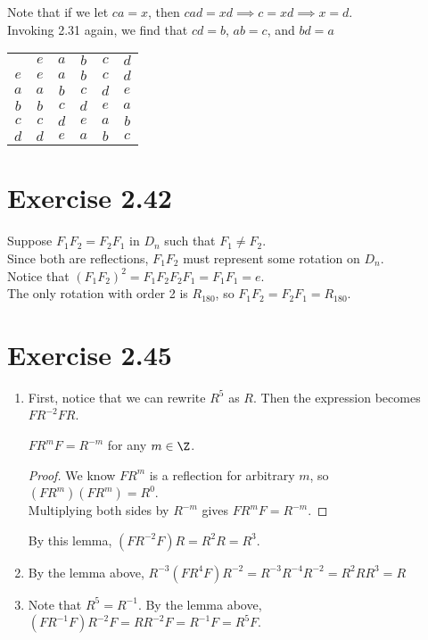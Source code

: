 \documentclass{article}
\begin{document}
Note that if we let \(ca=x\), then \(cad=xd\implies c=xd\implies x=d\). \\
Invoking 2.31 again, we find that \(cd=b\), \(ab=c\), and \(bd=a\)
\begin{center}
    \begin{tabular}{c | c c c c c}
        & $e$ & $a$ & $b$ & $c$ & $d$  \\
       \cline{1-6}
       $e$ & $e$ & $a$ & $b$ & $c$ & $d$ \\
       $a$ & $a$ & $b$ & $c$ & $d$ & $e$ \\
       $b$ & $b$ & $c$ & $d$ & $e$ & $a$ \\
       $c$ & $c$ & $d$ & $e$ & $a$ & $b$ \\
       $d$ & $d$ & $e$ & $a$ & $b$ & $c$ \\
   \end{tabular}
\end{center}

\section*{Exercise 2.42}
Suppose \(F_1F_2 = F_2F_1\) in \(D_n\) such that \(F_1\neq F_2\). \\
Since both are reflections, \(F_1F_2\) must represent some rotation on \(D_n\). \\
Notice that \((F_1F_2)^2=F_1F_2F_2F_1=F_1F_1=e\). \\
The only rotation with order 2 is \(R_{180}\), so \(F_1F_2=F_2F_1=R_{180}\).

\section*{Exercise 2.45}
\begin{enumerate}[label=(\alph*)]
    \item First, notice that we can rewrite \(R^5\) as \(R\). Then the expression becomes \(FR^{-2}FR\).
    \begin{lemma}
        \(FR^mF=R^{-m}\) for any \(m\in\Z\).
    \end{lemma}
    \begin{proof}
        We know \(FR^m\) is a reflection for arbitrary \(m\), so \((FR^m)(FR^m)=R^0\). \\
        Multiplying both sides by \(R^{-m}\) gives \(FR^mF=R^{-m}\).
    \end{proof}
    By this lemma, \((FR^{-2}F)R=R^2R=R^3\).
    \item By the lemma above, \(R^{-3}(FR^4F)R^{-2}=R^{-3}R^{-4}R^{-2}=R^2RR^3=R\)
    \item Note that \(R^5=R^{-1}\). By the lemma above, \((FR^{-1}F)R^{-2}F=RR^{-2}F=R^{-1}F=R^5F\).
\end{enumerate}
\end{document}
